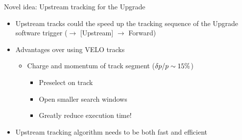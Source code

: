 \documentclass[aspectratio=1610]{beamer}
\begin{document}
\begin{frame}{Novel idea: Upstream tracking for the Upgrade}
\begin{itemize}
  \item Upstream tracks could the speed up the tracking sequence of the Upgrade software trigger (\velo $\to$ [Upstream] $\to$ Forward)
\end{itemize}
\begin{itemize}
  \item Advantages over using VELO tracks
    \begin{itemize}
      \item Charge and momentum of track segment ($\delta \mbox{$p$}/\mbox{$p$} \sim 15 \%$)
      \begin{itemize}
        \item[\ding{212}] Preselect on track \pt
        \item[\ding{212}] Open smaller search windows
        \item[\ding{70}] Greatly reduce execution time!
      \end{itemize}
    \end{itemize}
  \end{itemize}

  \begin{center}
  
  \end{center}

  \begin{itemize}
  \item Upstream tracking algorithm needs to be both fast and efficient
  \end{itemize}
\end{frame}
\end{document}
